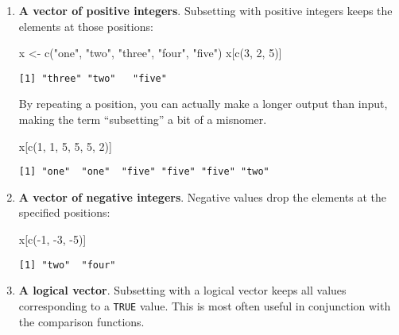 \documentclass[
  letterpaper,
  DIV=11,
  numbers=noendperiod]{scrreprt}
\newenvironment{Shaded}{\begin{snugshade}}{\end{snugshade}}
\newcommand{\DecValTok}[1]{\textcolor[rgb]{0.68,0.00,0.00}{#1}}
\newcommand{\FunctionTok}[1]{\textcolor[rgb]{0.28,0.35,0.67}{#1}}
\newcommand{\NormalTok}[1]{\textcolor[rgb]{0.00,0.23,0.31}{#1}}
\newcommand{\OtherTok}[1]{\textcolor[rgb]{0.00,0.23,0.31}{#1}}
\newcommand{\SpecialCharTok}[1]{\textcolor[rgb]{0.37,0.37,0.37}{#1}}
\newcommand{\StringTok}[1]{\textcolor[rgb]{0.13,0.47,0.30}{#1}}
\begin{document}
\begin{enumerate}
\def\labelenumi{\arabic{enumi}.}
\item
  \textbf{A vector of positive integers}. Subsetting with positive
  integers keeps the elements at those positions:

\begin{Shaded}
\begin{Highlighting}[]
\NormalTok{x }\OtherTok{\textless{}{-}} \FunctionTok{c}\NormalTok{(}\StringTok{"one"}\NormalTok{, }\StringTok{"two"}\NormalTok{, }\StringTok{"three"}\NormalTok{, }\StringTok{"four"}\NormalTok{, }\StringTok{"five"}\NormalTok{)}
\NormalTok{x[}\FunctionTok{c}\NormalTok{(}\DecValTok{3}\NormalTok{, }\DecValTok{2}\NormalTok{, }\DecValTok{5}\NormalTok{)]}
\end{Highlighting}
\end{Shaded}

\begin{verbatim}
[1] "three" "two"   "five" 
\end{verbatim}

  By repeating a position, you can actually make a longer output than
  input, making the term ``subsetting'' a bit of a misnomer.

\begin{Shaded}
\begin{Highlighting}[]
\NormalTok{x[}\FunctionTok{c}\NormalTok{(}\DecValTok{1}\NormalTok{, }\DecValTok{1}\NormalTok{, }\DecValTok{5}\NormalTok{, }\DecValTok{5}\NormalTok{, }\DecValTok{5}\NormalTok{, }\DecValTok{2}\NormalTok{)]}
\end{Highlighting}
\end{Shaded}

\begin{verbatim}
[1] "one"  "one"  "five" "five" "five" "two" 
\end{verbatim}
\item
  \textbf{A vector of negative integers}. Negative values drop the
  elements at the specified positions:

\begin{Shaded}
\begin{Highlighting}[]
\NormalTok{x[}\FunctionTok{c}\NormalTok{(}\SpecialCharTok{{-}}\DecValTok{1}\NormalTok{, }\SpecialCharTok{{-}}\DecValTok{3}\NormalTok{, }\SpecialCharTok{{-}}\DecValTok{5}\NormalTok{)]}
\end{Highlighting}
\end{Shaded}

\begin{verbatim}
[1] "two"  "four"
\end{verbatim}
\item
  \textbf{A logical vector}. Subsetting with a logical vector keeps all
  values corresponding to a \texttt{TRUE} value. This is most often
  useful in conjunction with the comparison functions.


\end{enumerate}
\end{document}

